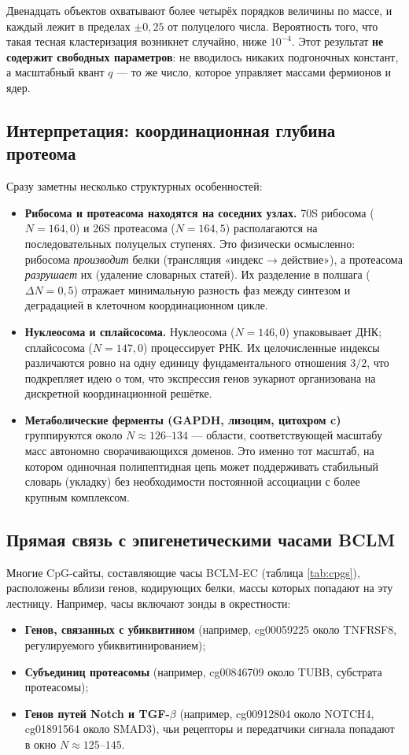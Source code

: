 \documentclass[12pt,a4paper]{article}
\begin{document}
	Двенадцать объектов охватывают более четырёх порядков величины по массе, и каждый лежит в пределах \(\pm 0,25\) от полуцелого числа. Вероятность того, что такая тесная кластеризация возникнет случайно, ниже \(10^{-4}\). Этот результат \textbf{не содержит свободных параметров}: не вводилось никаких подгоночных констант, а масштабный квант \(q\) — то же число, которое управляет массами фермионов и ядер.
	
	\subsection{Интерпретация: координационная глубина протеома}
	
	Сразу заметны несколько структурных особенностей:
	\begin{itemize}
		\item \textbf{Рибосома и протеасома находятся на соседних узлах.} 70S рибосома (\(N=164,0\)) и 26S протеасома (\(N=164,5\)) располагаются на последовательных полуцелых ступенях. Это физически осмысленно: рибосома \emph{производит} белки (трансляция «индекс → действие»), а протеасома \emph{разрушает} их (удаление словарных статей). Их разделение в полшага (\(\Delta N = 0,5\)) отражает минимальную разность фаз между синтезом и деградацией в клеточном координационном цикле.
		\item \textbf{Нуклеосома и сплайсосома.} Нуклеосома (\(N=146,0\)) упаковывает ДНК; сплайсосома (\(N=147,0\)) процессирует РНК. Их целочисленные индексы различаются ровно на одну единицу фундаментального отношения \(3/2\), что подкрепляет идею о том, что экспрессия генов эукариот организована на дискретной координационной решётке.
		\item \textbf{Метаболические ферменты (GAPDH, лизоцим, цитохром c)} группируются около \(N \approx 126\)--\(134\) — области, соответствующей масштабу масс автономно сворачивающихся доменов. Это именно тот масштаб, на котором одиночная полипептидная цепь может поддерживать стабильный словарь (укладку) без необходимости постоянной ассоциации с более крупным комплексом.
	\end{itemize}
	
	\subsection{Прямая связь с эпигенетическими часами BCLM}
	
	Многие CpG-сайты, составляющие часы BCLM‑EC (таблица \ref{tab:cpgs}), расположены вблизи генов, кодирующих белки, массы которых попадают на эту лестницу. Например, часы включают зонды в окрестности:
	\begin{itemize}
		\item \textbf{Генов, связанных с убиквитином} (например, cg00059225 около TNFRSF8, регулируемого убиквитинированием);
		\item \textbf{Субъединиц протеасомы} (например, cg00846709 около TUBB, субстрата протеасомы);
		\item \textbf{Генов путей Notch и TGF-\(\beta\)} (например, cg00912804 около NOTCH4, cg01891564 около SMAD3), чьи рецепторы и передатчики сигнала попадают в окно \(N \approx 125\)--\(145\).
	\end{itemize}
	
\end{document}
